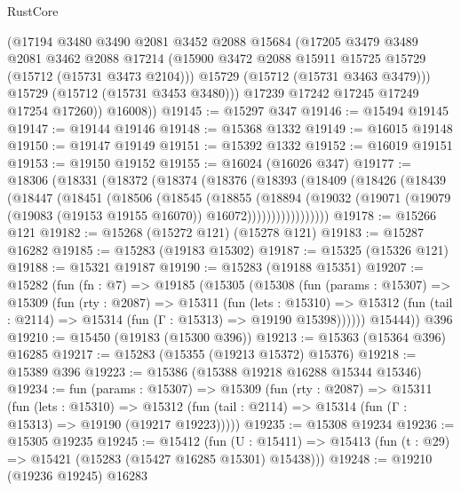 \begin{lexlean}{RustCore}
\begin{coremodule}
            (@17194
              @3480
              @3490
              @2081
              @3452
              @2088
              @15684
              (@17205
                @3479
                @3489
                @2081
                @3462
                @2088
                @17214
                (@15900 @3472 @2088 @15911 @15725 @15729 (@15712 (@15731 @3473 @2104)))
                @15729
                (@15712 (@15731 @3463 @3479)))
              @15729
              (@15712 (@15731 @3453 @3480)))
            @17239
            @17242
            @17245
            @17249
            @17254
            @17260))
        @16008))
@19145 := @15297 @347
@19146 := @15494 @19145
@19147 := @19144 @19146
@19148 := @15368 @1332
@19149 := @16015 @19148
@19150 := @19147 @19149
@19151 := @15392 @1332
@19152 := @16019 @19151
@19153 := @19150 @19152
@19155 := @16024 (@16026 @347)
@19177 := @18306
    (@18331
      (@18372
        (@18374
          (@18376
            (@18393
              (@18409
                (@18426
                  (@18439
                    (@18447
                      (@18451
                        (@18506
                          (@18545
                            (@18855
                              (@18894
                                (@19032
                                  (@19071
                                    (@19079 (@19083 (@19153 @19155 @16070)) @16072)))))))))))))))))
@19178 := @15266 @121
@19182 := @15268 (@15272 @121) (@15278 @121)
@19183 := @15287 @16282
@19185 := @15283 (@19183 @15302)
@19187 := @15325 (@15326 @121)
@19188 := @15321 @19187
@19190 := @15283 (@19188 @15351)
@19207 := @15282
    (fun (fn : @7) =>
    @19185
      (@15305
        (@15308
          (fun (params : @15307) =>
          @15309
            (fun (rty : @2087) =>
            @15311
              (fun (lets : @15310) =>
              @15312 (fun (tail : @2114) => @15314 (fun (Γ : @15313) => @19190 @15398))))))
        @15444))
    @396
@19210 := @15450 (@19183 (@15300 @396))
@19213 := @15363 (@15364 @396) @16285
@19217 := @15283 (@15355 (@19213 @15372) @15376)
@19218 := @15389 @396
@19223 := @15386 (@15388 @19218 @16288 @15344 @15346)
@19234 := fun (params : @15307) =>
  @15309
    (fun (rty : @2087) =>
    @15311
      (fun (lets : @15310) =>
      @15312 (fun (tail : @2114) => @15314 (fun (Γ : @15313) => @19190 (@19217 @19223)))))
@19235 := @15308 @19234
@19236 := @15305 @19235
@19245 := @15412
    (fun (U : @15411) => @15413 (fun (t : @29) => @15421 (@15283 (@15427 @16285 @15301) @15438)))
@19248 := @19210 (@19236 @19245) @16283

\end{coremodule}
\end{lexlean}
